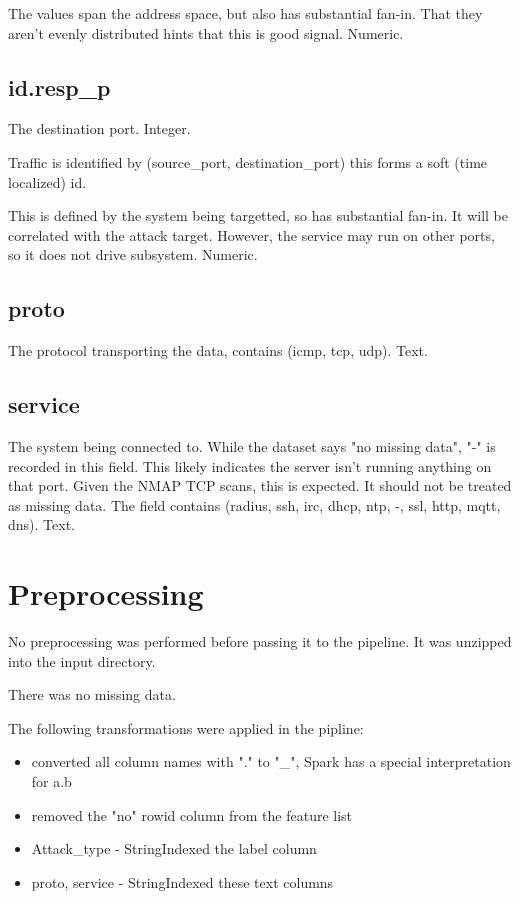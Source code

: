 \documentclass[11pt]{article}
\begin{document}
The values span the address space, but also has substantial fan-in. That they aren't evenly distributed hints that this is good signal. Numeric.

\subsection{id.resp\_p}

The destination port. Integer.

Traffic is identified by (source\_port, destination\_port) this forms a soft (time localized) id.

This is defined by the system being targetted, so has substantial fan-in. It will be correlated with the attack target. However, the service may run on other ports, so it does not drive subsystem. Numeric.

\subsection{proto}

The protocol transporting the data, contains (icmp, tcp, udp). Text.

\subsection{service}

The system being connected to. While the dataset says "no missing data", "-" is recorded in this field. This likely indicates the server isn't running anything on that port. Given the NMAP TCP scans, this is expected. It should not be treated as missing data. The field contains (radius, ssh, irc, dhcp, ntp, -, ssl, http, mqtt, dns). Text.

\section{Preprocessing}

No preprocessing was performed before passing it to the pipeline. It was unzipped into the input directory.

There was no missing data.

The following transformations were applied in the pipline:

\begin{itemize}[nosep]
	\item converted all column names with "." to "\_", Spark has a special interpretation for a.b
	\item removed the "no" rowid column from the feature list
	\item Attack\_type - StringIndexed the label column
	\item proto, service - StringIndexed these text columns
\end{itemize}
\end{document}
